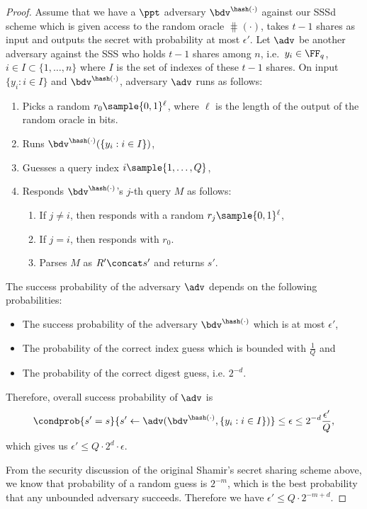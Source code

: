 \documentclass[envcountsame,runningheads,notitlepage]{llncs}
\begin{document}
	\begin{proof}
		Assume that we have a $\ppt$ adversary  $\bdv^{\hash(\cdot)}$ against our SSSd scheme which is given access to the random oracle $\hash(\cdot)$, takes $t-1$ shares as input and outputs the secret with probability at most $\epsilon'$.
		Let $\adv$ be another adversary against the SSS who holds $t-1$ shares among $n$, i.e.~$y_i \in \FF_q$, $i \in I \subset \{1, \ldots, n\}$ where $I$ is the set of indexes of these $t-1$ shares.
		On input $\{y_i: i \in I\}$ and  $\bdv^{\hash(\cdot)}$, adversary $\adv$ runs as follows:
		\begin{enumerate}
			\item Picks a random $r_{0} \sample \{0,1\}^{\ell}$, where $\ell$ is the length of the output of the random oracle in bits.
			\item Runs $\bdv^{\hash(\cdot)}(\{y_i: i \in I\})$, 
			\item Guesses a query index $i \sample \{1, \ldots, Q\}$,
			\item Responds $\bdv^{\hash(\cdot)}$'s $j$-th query $M$ as follows:
			\begin{enumerate}
				\item If $j \neq i$, then responds with a random $r_{j} \sample \{0,1\}^{\ell}$, 
				\item If $j = i$, then responds with $r_{0}$.	
				\item Parses $M$ as $R'\concat s'$ and returns $s'$.
			\end{enumerate}
		
		\end{enumerate} 
		The success probability of the adversary $\adv$ depends on the following probabilities:
		\begin{itemize}
			\item The success probability of the adversary $\bdv^{\hash(\cdot)}$ which is at most $\epsilon'$,
			\item The probability of the correct index guess which is bounded with $\frac{1}{Q}$ and 
			\item The probability of the correct digest guess, i.e. $2^{-d}$.
		\end{itemize}
		
		Therefore, overall success probability of $\adv$ is 
		\begin{equation*}
		\condprob{s' = s}{s' \leftarrow \adv(\bdv^{\hash(\cdot)}, \{y_i: i \in I\})} \leq \epsilon \leq 2^{-d}\frac{\epsilon'}{Q},
		\end{equation*}
		which gives us $\epsilon' \leq Q \cdot 2^{d} \cdot \epsilon$.
		
		From the security discussion of the original Shamir's secret sharing scheme above, we know that probability of a random guess is $2^{-m}$, which is the best probability that any unbounded adversary succeeds. Therefore we have $\epsilon' \leq Q \cdot 2^{-m+d}$.
		
	\end{proof}
	
	
	
	
	
	
\end{document}
